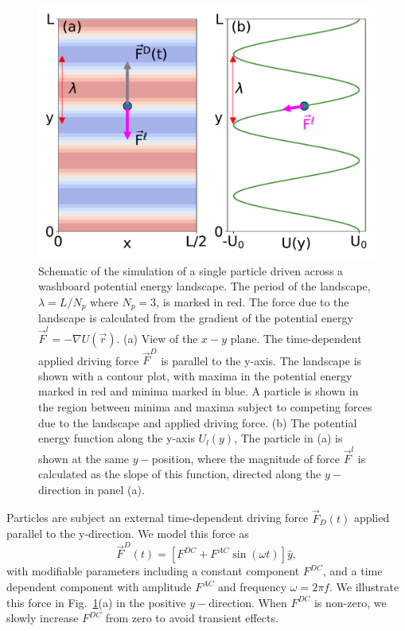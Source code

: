 \documentclass[twocolumn,preprintnumbers,amsmath,amssymb,aps,prx]{revtex4}
\begin{document}
\begin{center}
\begin{figure}[h!]
\centering
\includegraphics[width=\columnwidth]{landscape.pdf}
\caption{
  Schematic of the simulation
  of a single particle
  driven across a washboard potential
  energy landscape.
  The period of the landscape, $\lambda = L/N_p$ 
  where $N_p = 3$, is marked in red.
  The force due to the landscape %
  is calculated from the gradient of the potential
  energy 
  $\vec{F}^l = -\nabla U(\vec{r})$.
  (a) View of the $x-y$ plane. %
  The time-dependent applied driving force $\vec{F}^D$
  is parallel to the y-axis.
  The landscape is shown with a contour plot,
  with maxima in the potential energy marked in red
  and minima marked in blue.
  A particle is shown in the region between minima and maxima
  subject to competing forces due to the landscape and applied driving force.
  (b) The potential energy function
  along the y-axis $U_l(y)$,
  The particle in (a) is shown at the same $y-$position,
  where the magnitude of force $\vec{F}^l$ is calculated as the slope of this function,
  directed along the $y-$direction in panel (a).
  }
\label{fig:landscape0}
\end{figure}
\end{center}

 
 Particles are subject an external time-dependent driving force
$\vec{F}_{D}(t)$
applied parallel to the y-direction.
We model this force as
\begin{equation}
  \vec{F}^{D}(t) = [F^{DC} + F^{AC} \sin(\omega t)] \hat{y},
    \label{eq:drive}
\end{equation}
with modifiable parameters including
a constant component $F^{DC}$,
and a time dependent component with amplitude $F^{AC}$
and frequency $\omega = 2 \pi f$.
We illustrate this force in Fig.~\ref{fig:landscape0}(a)
in the positive $y-$direction.
When $F^{DC}$ is non-zero,  
we slowly increase 
$F^{DC}$ from zero
to avoid transient effects.
\end{document}
